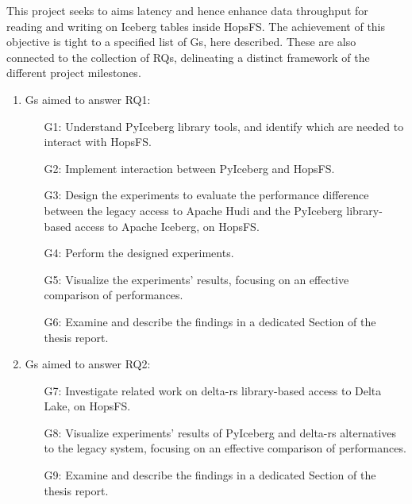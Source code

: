 This project seeks to aims latency and hence enhance data throughput for reading and writing on Iceberg tables inside \gls{HopsFS}. The achievement of this objective is tight to a specified list of \glspl{G}, here described. These are also connected to the collection of \glspl{RQ}, delineating a distinct framework of the different project milestones.

\begin{enumerate}
    \item \glspl{G} aimed to answer RQ1: 
        \begin{enumerate}
            \item[G1:] Understand PyIceberg library tools, and identify which are needed to interact with \gls{HopsFS}.
            \item[G2:] Implement interaction between PyIceberg and \gls{HopsFS}.
            \item[G3:] Design the experiments to evaluate the performance difference between the legacy access to Apache Hudi and the PyIceberg library-based access to Apache Iceberg, on \gls{HopsFS}. 
            \item[G4:] Perform the designed experiments.
            \item[G5:] Visualize the experiments' results, focusing on an effective comparison of performances.
            \item[G6:] Examine and describe the findings in a dedicated Section of the thesis report.
        \end{enumerate}
    \item \glspl{G} aimed to answer RQ2:
        \begin{enumerate}
            \item[G7:] Investigate related work on delta-rs library-based access to Delta Lake, on \gls{HopsFS}.
            \item[G8:] Visualize experiments' results of PyIceberg and delta-rs alternatives to the legacy system, focusing on an effective comparison of performances.
            \item[G9:] Examine and describe the findings in a dedicated Section of the thesis report.
        \end{enumerate}
\end{enumerate}

